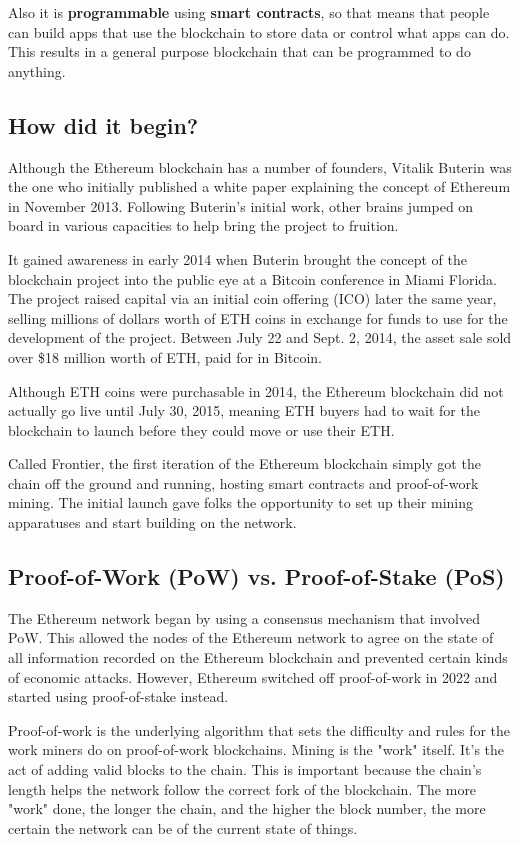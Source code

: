 \documentclass[MSE,Master,english]{twbook}%
\begin{document}
Also it is \textbf{programmable} using \textbf{smart contracts}, so that means that people can build apps that use the blockchain to store data or control what apps can do. This results in a general purpose blockchain that can be programmed to do anything.\cite{ethereum}

\subsection{How did it begin?}
Although the Ethereum blockchain has a number of founders, Vitalik Buterin\cite{ethHistory} was the one who initially published a white paper explaining the concept of Ethereum in November 2013. Following Buterin's initial work, other brains jumped on board in various capacities to help bring the project to fruition.

It gained awareness in early 2014 when Buterin brought the concept of the blockchain project into the public eye at a Bitcoin conference in Miami Florida. The project raised capital via an initial coin offering (ICO) later the same year, selling millions of dollars worth of ETH coins in exchange for funds to use for the development of the project. Between July 22 and Sept. 2, 2014, the asset sale sold over \$18 million worth of ETH, paid for in Bitcoin.

Although ETH coins were purchasable in 2014, the Ethereum blockchain did not actually go live until July 30, 2015, meaning ETH buyers had to wait for the blockchain to launch before they could move or use their ETH. 

Called Frontier, the first iteration of the Ethereum blockchain simply got the chain off the ground and running, hosting smart contracts and proof-of-work mining. The initial launch gave folks the opportunity to set up their mining apparatuses and start building on the network.

\subsection{Proof-of-Work (PoW) vs. Proof-of-Stake (PoS)}
The Ethereum network began by using a consensus mechanism that involved \ac{PoW}\cite{PoW}. This allowed the nodes of the Ethereum network to agree on the state of all information recorded on the Ethereum blockchain and prevented certain kinds of economic attacks. However, Ethereum switched off proof-of-work in 2022 and started using proof-of-stake instead.

Proof-of-work is the underlying algorithm that sets the difficulty and rules for the work miners do on proof-of-work blockchains. Mining is the "work" itself. It's the act of adding valid blocks to the chain. This is important because the chain's length helps the network follow the correct fork of the blockchain. The more "work" done, the longer the chain, and the higher the block number, the more certain the network can be of the current state of things. \\
\end{document}
